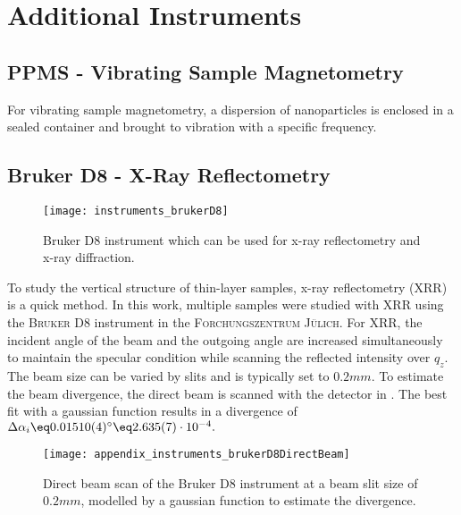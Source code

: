 \documentclass[\main/dresen_thesis.tex]{subfiles}
\begin{document}
\chapter{Additional Instruments}
\section{PPMS - Vibrating Sample Magnetometry}
\label{app:additionalExperimentalTechniques:vsm}
For vibrating sample magnetometry, a dispersion of nanoparticles is enclosed in a sealed container and brought to vibration with a specific frequency.

\section{Bruker D8 - X-Ray Reflectometry}
\label{app:additionalExperimentalTechniques:xrr}
\begin{figure}[h]
  \centering
  \texttt{[image: instruments\_brukerD8]}
  \caption{\label{fig:appendix:instruments:brukerD8}Bruker D8 instrument which can be used for x-ray reflectometry and x-ray diffraction.}
\end{figure}
To study the vertical structure of thin-layer samples, x-ray reflectometry (XRR) is a quick method. In this work, multiple samples were studied with XRR using the \textsc{Bruker D8} instrument in the \textsc{Forchungszentrum J\"ulich}.
For XRR, the incident angle of the beam and the outgoing angle are increased simultaneously to maintain the specular condition while scanning the reflected intensity over $q_z$.
The beam size can be varied by slits and is typically set to $0.2 \unit{mm}$.
To estimate the beam divergence, the direct beam is scanned with the detector in .
The best fit with a gaussian function results in a divergence of $\Delta \alpha_i \eq 0.01510(4) ^\circ \eq 2.635(7) \cdot 10^{-4}.$
\begin{figure}[tb]
  \centering
  \texttt{[image: appendix\_instruments\_brukerD8DirectBeam]}
  \caption{\label{fig:appendix:instruments:brukerD8DirectBeam}Direct beam scan of the Bruker D8 instrument at a beam slit size of $0.2 \unit{mm}$, modelled by a gaussian function to estimate the divergence.}
\end{figure}
\end{document}
